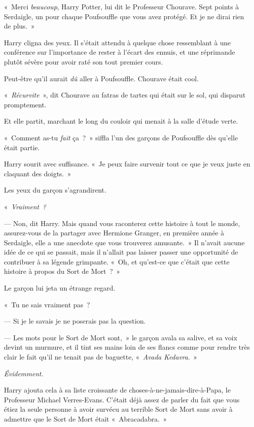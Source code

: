 «~Merci \emph{beaucoup}, Harry Potter, lui dit le Professeur Chourave. Sept points à Serdaigle, un pour chaque Poufsouffle que vous avez protégé. Et je ne dirai rien de plus.~»

Harry cligna des yeux. Il s'était attendu à quelque chose ressemblant à une conférence sur l'importance de rester à l'écart des ennuis, et une réprimande plutôt sévère pour avoir raté son tout premier cours.

Peut-être qu'il aurait \emph{dû} aller à Poufsouffle. Chourave était cool.

«~\emph{Récurvite}~», dit Chourave au fatras de tartes qui était sur le sol, qui disparut promptement.

Et elle partit, marchant le long du couloir qui menait à la salle d'étude verte.

«~Comment as-tu \emph{fait} ça~?~» siffla l'un des garçons de Poufsouffle dès qu'elle était partie.

Harry sourit avec suffisance. «~Je peux faire survenir tout ce que je veux juste en claquant des doigts.~»

Les yeux du garçon s'agrandirent.

«~\emph{Vraiment~?}

--- Non, dit Harry. Mais quand vous raconterez cette histoire à tout le monde, assurez-vous de la partager avec Hermione Granger, en première année à Serdaigle, elle a une anecdote que vous trouverez amusante.~» Il n'avait aucune idée de ce qui se passait, mais il n'allait pas laisser passer une opportunité de contribuer à sa légende grimpante. «~Oh, et qu'est-ce que c'était que cette histoire à propos du Sort de Mort~?~»

Le garçon lui jeta un étrange regard.

«~Tu ne sais vraiment pas~?

--- Si je le savais je ne poserais pas la question.

--- Les mots pour le Sort de Mort sont,~» le garçon avala sa salive, et sa voix devint un murmure, et il tint ses mains loin de ses flancs comme pour rendre très clair le fait qu'il ne tenait pas de baguette, «~\emph{Avada Kedavra}.~»

\emph{Évidemment.}

Harry ajouta cela à sa liste croissante de choses-à-ne-jamais-dire-à-Papa, le Professeur Michael Verres-Evans. C'était déjà assez de parler du fait que vous étiez la seule personne à avoir survécu au terrible Sort de Mort sans avoir à admettre que le Sort de Mort était «~Abracadabra.~»

